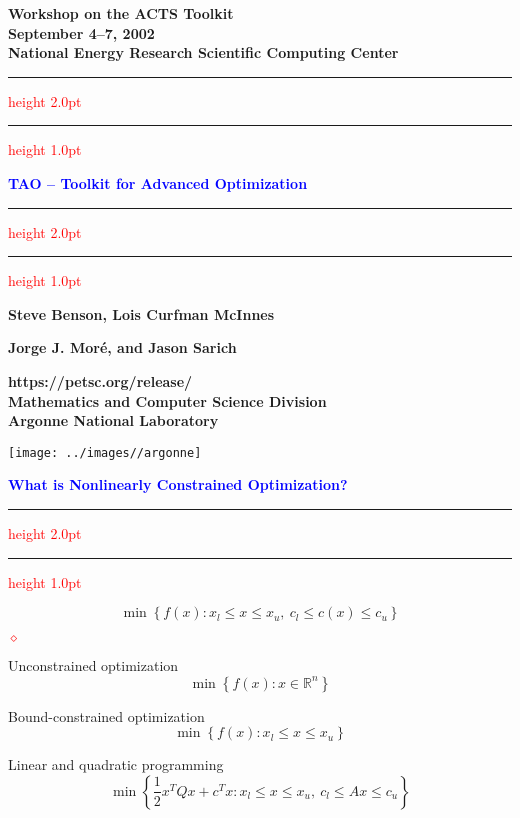 \documentclass{seminar}
\newcommand{\R}{\mbox{${\mathbb R}$}}
\newcommand{\half}{{\textstyle{\frac{1}{2}}}}
\newcommand{\reddiamond}{\textcolor{red}{$\diamond$}}
\newcommand{\redstripe}{\textcolor{red}{\hrule height 2.0pt\hfil}
             \vspace{-1.8pt}
             \textcolor{red}{\hrule height 1.0pt\hfil}
}
\newcommand{\heading}[1]{%
   \centerline{\textcolor{blue}{\textbf{#1}}}%
    \redstripe%
    \bigskip
}
\begin{document}
\begin{slide}

\begin{center}
{\bf
Workshop on the ACTS Toolkit \\
September 4--7, 2002 \\
National Energy Research Scientific Computing Center
}
\end{center}

\redstripe

\begin{center}
{\bf
\textcolor{blue}{TAO -- Toolkit for Advanced Optimization}
}

\redstripe

\medskip

\centerline{\bf Steve Benson, Lois Curfman McInnes} 
\centerline{\bf Jorge J. Mor\'e, and Jason Sarich}

\end{center}


\parbox[b]{3in}{\bf https://petsc.org/release/ \bigskip \\
\small  Mathematics and Computer Science Division \\ 
Argonne National Laboratory} \texttt{[image: ../images//argonne]}

\end{slide}


\begin{slide}

\heading{What is Nonlinearly Constrained Optimization?}

\[
\min \left \{ f(x): x_l \le x \le x_u , \ c_l \le c(x) \le c_u \right \}
\]

\medskip

\begin{list}{\reddiamond}
{
}
\item
Unconstrained optimization
\[
\min \left \{  f(x) : x \in \R^n \right \}
\]
\item
Bound-constrained optimization
\[
\min \left \{  f(x) : x_l \le x \le x_u \right \}
\]
\item
Linear and quadratic programming
\[
\min \left \{ \half x^T Q x + c^T x : x_l \le x \le x_u , 
\ c_l \le Ax \le c_u \right \}
\]
\end{list}

\vfill

\end{slide}
\end{document}
